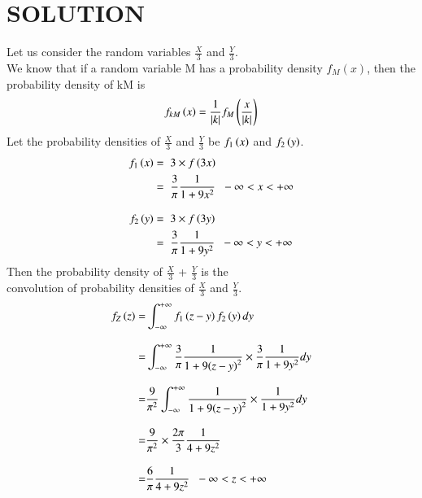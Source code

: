 \documentclass[journal,12pt,twocolumn]{IEEEtran}
\begin{document}
        \section*{SOLUTION}
        Let us consider the random variables $\displaystyle\frac{X}{3}$ and $\displaystyle\frac{Y}{3}$.\\[0.3cm]
We know that if a random variable M has a probability density $f_M(x)$, then the probability density of kM is
\begin{align}
    f_{kM}\left(x\right) = \frac{1}{\vert k\vert} f_M\left(\frac{x}{\vert k\vert}\right)
\end{align}
Let the probability densities of $\displaystyle\frac{X}{3}$ and $\displaystyle\frac{Y}{3}$ be $f_{1}\left(x\right)$ and $f_{2}\left(y\right)$.
\begin{align}
    f_{1}\left(x\right) = & \hspace{0.2cm} 3\times f\left(3x\right)                                                                \\
    =               & \hspace{0.2cm} \displaystyle\frac{3}{\pi} \frac{1}{1+9{x}^2} \hspace{0.2cm}-\infty < x < +\infty \\[0.3cm]
    f_{2}\left(y\right) = & \hspace{0.2cm} 3\times f\left(3y\right)                                                                \\
    =               & \hspace{0.2cm} \displaystyle\frac{3}{\pi} \frac{1}{1+9{y}^2} \hspace{0.2cm}-\infty < y < +\infty
\end{align}
Then the probability density of $\displaystyle\frac{X}{3}$ + $\displaystyle\frac{Y}{3}$ is the\\[0.1cm]convolution of probability densities of $\displaystyle\frac{X}{3}$ and $\displaystyle\frac{Y}{3}$.
\begin{align}
    f_{Z}\left(z\right) = & \int_{-\infty}^{+\infty} f_{1}\left(z-y\right) f_{2}\left(y\right) dy                                                                              \\[0.3cm]
    =               & \int_{-\infty}^{+\infty} \displaystyle\frac{3}{\pi}\frac{1}{1+9{\left(z-y\right)^2}}\times\displaystyle\frac{3}{\pi} \frac{1}{1+9{{y}^2}} dy \\[0.3cm]
    =               & \frac{9}{{\pi}^2} \int_{-\infty}^{+\infty} \frac{1}{1+9{\left(z-y\right)^2}}\times\frac{1}{1+9{{y}^2}} dy                                    \\[0.3cm]
    =               & \frac{9}{{\pi}^2}\times\frac{2\pi}{3} \displaystyle\frac{1}{4 + 9{z}^2}                                                                \\[0.3cm]
    =               & \frac{6}{\pi} \displaystyle\frac{1}{4 + 9{z}^2}\hspace{0.2cm}-\infty < z < +\infty
\end{align}
\end{document}
